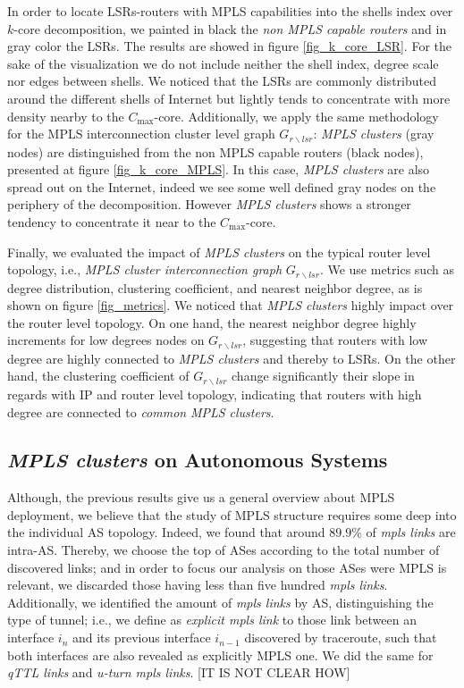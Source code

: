 In order to locate LSRs-routers with MPLS capabilities into the shells index over $k$-core decomposition, we painted in black the \textit{non MPLS capable routers} and in gray color the LSRs. 
The results are showed in figure \ref{fig_k_core_LSR}. 
For the sake of the visualization we do not include neither the shell index, degree scale nor edges between shells. 
We noticed that the LSRs are commonly distributed around the different shells of Internet but  lightly tends to concentrate with more density nearby to the $C_{\max}$-core.
Additionally, we apply the same methodology for the MPLS interconnection cluster level graph $G_{r\backslash lsr}$: \textit{MPLS clusters} (gray nodes) are distinguished from the non MPLS capable routers (black nodes), presented at figure \ref{fig_k_core_MPLS}.
In this case,  \textit{MPLS clusters}  are also spread out on the Internet, indeed we see some well defined gray nodes on the periphery of the decomposition. However \textit{MPLS clusters} shows a stronger tendency to concentrate it near to the $C_{\max}$-core. 

Finally, we evaluated the impact of \textit{MPLS clusters} on the typical router level topology, i.e., \textit{MPLS cluster interconnection graph} $G_{r \backslash lsr }$. We use metrics such as degree distribution, clustering coefficient, and nearest neighbor degree, as is shown on figure \ref{fig_metrics}. 
We noticed that \textit{MPLS clusters} highly impact over the router level topology. 
On one hand, the nearest neighbor degree highly increments for low degrees nodes on $G_{r \backslash lsr }$, suggesting that routers with low degree are highly connected to \textit{MPLS clusters} and thereby to LSRs. 
On the other hand, the clustering coefficient of $G_{r \backslash lsr }$ change significantly their slope in regards with IP and router level topology, indicating that routers with high degree are connected to \textit{common} \textit{MPLS clusters}.


\subsection{\textit{MPLS clusters} on Autonomous Systems}\label{cluster.as}

Although, the previous results give us a general overview about MPLS deployment, we believe that the study of MPLS structure requires some deep into the individual AS topology. 
Indeed, we found that around $89.9\%$ of \textit{mpls links} are intra-AS.  
Thereby, we choose the top of ASes according to the total number of discovered links; and in order to focus our analysis on those ASes were MPLS is relevant, we discarded those having less than five hundred \textit{mpls links}. 
Additionally, we identified  the amount of \textit{mpls links} by AS, distinguishing the type of tunnel; i.e., we define as \textit{explicit mpls link} to those link between an interface $i_{n}$  and its previous interface $i_{n-1}$ discovered by traceroute, such that both interfaces are also revealed as explicitly MPLS one.
We did the same for \textit{qTTL links} and  \textit{u-turn mpls links}. [IT IS NOT CLEAR HOW]

